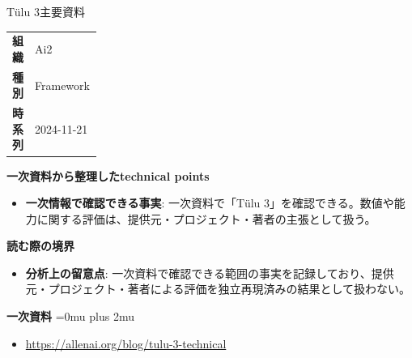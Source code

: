 \begin{technicalnote}{Tülu 3}{主要資料}
\begingroup
\begin{tabularx}{\linewidth}{@{}>{\bfseries}p{0.22\linewidth}X@{}}
組織 & Ai2 \\
種別 & Framework \\
時系列 & 2024-11-21 \\
\end{tabularx}
\smallskip
{\bfseries 一次資料から整理したtechnical points}
\begin{itemize}[leftmargin=1.5em,itemsep=0.35em]
\item \textbf{一次情報で確認できる事実}: 一次資料で「Tülu 3」を確認できる。数値や能力に関する評価は、提供元・プロジェクト・著者の主張として扱う。
\end{itemize}
\begin{minipage}{\linewidth}
{\bfseries 読む際の境界}
\begin{itemize}[leftmargin=1.5em,itemsep=0.35em]
\item \textbf{分析上の留意点}: 一次資料で確認できる範囲の事実を記録しており、提供元・プロジェクト・著者による評価を独立再現済みの結果として扱わない。
\end{itemize}
\begin{samepage}
{\bfseries 一次資料}
\begingroup\sloppy
\Urlmuskip=0mu plus 2mu\relax
\begin{itemize}[leftmargin=1.5em,itemsep=0.25em]
\item {\scriptsize\url{https://allenai.org/blog/tulu-3-technical}}
\end{itemize}
\endgroup
\end{samepage}
\end{minipage}
\endgroup
\end{technicalnote}
\medskip

